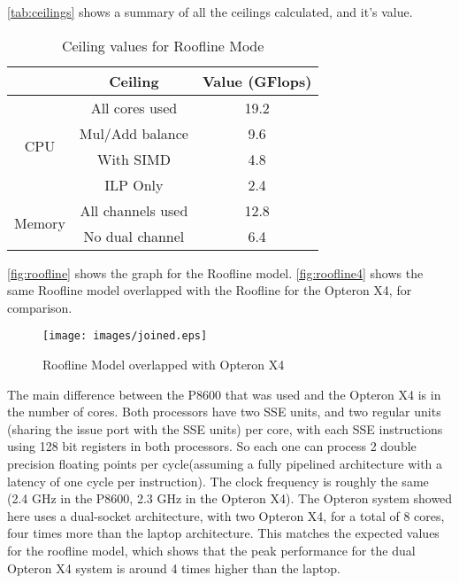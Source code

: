 \documentclass[twocolumn,10pt]{scrartcl}
\begin{document}
\autoref{tab:ceilings} shows a summary of all the ceilings calculated, and it's value.

\begin{table}[!htp]
	\begin{center}
		\begin{tabular}{|c|c|c|}
				\hline
				&	\textbf{Ceiling}	&	\textbf{Value (GFlops)}	\\
				\hline
				\hline
			\multicolumn{1}{|c|}{\multirow{4}{*}{CPU}}
				&	All cores used		&	19.2					\\
				&	Mul/Add balance		&	9.6						\\
				&	With SIMD			&	4.8						\\
				&	ILP Only			&	2.4						\\
			\hline
			\hline
			\multicolumn{1}{|c|}{\multirow{2}{*}{Memory}}
				&	All channels used	&	12.8\footnotemark		\\
				&	No dual channel		&	6.4						\\
				\hline
		\end{tabular}
	\end{center}
	\caption{Ceiling values for Roofline Mode \label{tab:ceilings}}
\end{table}

\autoref{fig:roofline} shows the graph for the Roofline model. \autoref{fig:roofline4} shows the same Roofline model overlapped with the Roofline for the Opteron X4, for comparison.

\newpage

\begin{figure}[!htp]
	\texttt{[image: images/joined.eps]}
	\caption[Roofline Model with Opteron X4]{Roofline Model overlapped with Opteron X4 \label{fig:rooflinex4}}
\end{figure}

The main difference between the P8600 that was used and the Opteron X4 is in the number of cores. Both processors have two SSE units, and two regular units (sharing the issue port with the SSE units) per core, with each SSE instructions using 128 bit registers in both processors. So each one can process 2 double precision floating points per cycle(assuming a fully pipelined architecture with a latency of one cycle per instruction). The clock frequency is roughly the same (2.4 GHz in the P8600, 2.3 GHz in the Opteron X4). The Opteron system showed here uses a dual-socket architecture, with two Opteron X4, for a total of 8 cores, four times more than the laptop architecture. This matches the expected values for the roofline model, which shows that the peak performance for the dual Opteron X4 system is around 4 times higher than the laptop.
\end{document}
